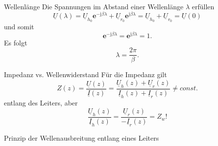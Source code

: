 \documentclass{beamer}
\begin{document}
\begin{frame}{Wellenlänge}
Die Spannungen im Abstand einer Wellenlänge $\lambda$ erfüllen
\begin{equation}
\underline{U}(\lambda) =
\underline{U}_{h_{0}} \mathbf{e}^{- \mathrm{j} \beta \lambda}
+
\underline{U}_{r_{0}} \mathbf{e}^{\mathrm{j} \beta \lambda}
= \underline{U}_{h_{0}} + \underline{U}_{r_{0}}
= \underline{U}(0)
\end{equation}
und somit
\[
\mathbf{e}^{- \mathrm{j} \beta \lambda} = \mathbf{e}^{\mathrm{j} \beta \lambda} = 1.
\]
Es folgt
\[
\lambda = \frac{2 \pi}{\beta}.
\]
\end{frame}


\begin{frame}{Impedanz vs. Wellenwiderstand}
Für die Impedanz gilt
\begin{equation*}
    Z(z) = \frac{\underline{U}(z)}{\underline{I}(z)} =
     \frac{\underline{U}_{h}(z) + \underline{U}_{r}(z)}{\underline{I}_{h}(z) +
     \underline{I}_{r}(z)} \ne const.
\end{equation*}
entlang des Leiters, aber
\[ \frac{\underline{U}_{h}(z)}{\underline{I}_{h}(z)}
= \frac{\underline{U}_{r}(z)}{- \underline{I}_{r}(z)} = Z_{w}! \]

\end{frame}


\begin{frame}{Prinzip der Wellenausbreitung entlang eines Leiters}

    \begin{figure}[!htb]
        \begin{center}
            
        \end{center}
    \end{figure}

\end{frame}
\end{document}
